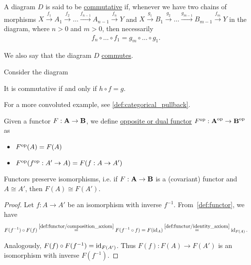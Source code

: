 \begin{definition}\label{def:commutative_diagram}
  A diagram $D$ is said to be \uline{commutative} if, whenever we have two chains of morphisms $X \overset {f_1} \to A_1 \overset {f_2} \to \ldots \overset {f_{n-1}} \to A_{n-1} \overset {f_n} \to Y$ and $X \overset {g_1} \to B_1 \overset {g_2} \to \ldots \overset {g_{m-1}} \to B_{m-1} \overset {f_m} \to Y$ in the diagram, where $n > 0$ and $m > 0$, then necessarily
  \begin{align*}
    f_n \circ \ldots \circ f_1 = g_m \circ \ldots \circ g_1.
  \end{align*}

  We also say that the diagram $D$ \uline{commutes}.
\end{definition}

\begin{example}\label{ex:commutative_diagrams}
  Consider the diagram
  \begin{center}
  \end{center}

  It is commutative if and only if $h \circ f = g$.

  For a more convoluted example, see \cref{def:categorical_pullback}.
\end{example}

\begin{definition}\label{def:opposite_functor}\cite[definition 5.2.1]{Leinster2014}
  Given a functor $F: \operatorname{\mathbf{A}} \to \operatorname{\mathbf{B}}$, we define \uline{opposite or dual functor} $F^{\operatorname{op}}: \operatorname{\mathbf{A}}^{\operatorname{op}} \to \operatorname{\mathbf{B}}^{\operatorname{op}}$ as
  \begin{itemize}
    \item $F^{\operatorname{op}}(A) = F(A)$
    \item $F^{\operatorname{op}}(f^{\operatorname{op}}: A' \to A) = F(f: A \to A')$
  \end{itemize}
\end{definition}

\begin{proposition}\label{thm:functors_preserve_isomorphisms}\cite[exercise 1.2.21]{Leinster2014}
  Functors preserve isomorphisms, i.e. if $F: \operatorname{\mathbf{A}} \to \operatorname{\mathbf{B}}$ is a (covariant) functor and $A \cong A'$, then $F(A) \cong F(A')$.
\end{proposition}
\begin{proof}
  Let $f: A \to A'$ be an isomorphism with inverse $f^{-1}$. From~\cref{def:functor}, we have
  \begin{align*}
    F(f^{-1}) \circ F(f)
    \overset{\ref{def:functor/composition_axiom}} =
    F(f^{-1} \circ f)
    =
    F(\operatorname{id}_A)
    \overset{\ref{def:functor/identity_axiom}} =
    \operatorname{id}_{F(A)}.
  \end{align*}

  Analogously, $F(f) \circ F(f^{-1}) = \operatorname{id}_{F(A')}$. Thus $F(f): F(A) \to F(A')$ is an isomorphism with inverse $F(f^{-1})$.
\end{proof}

